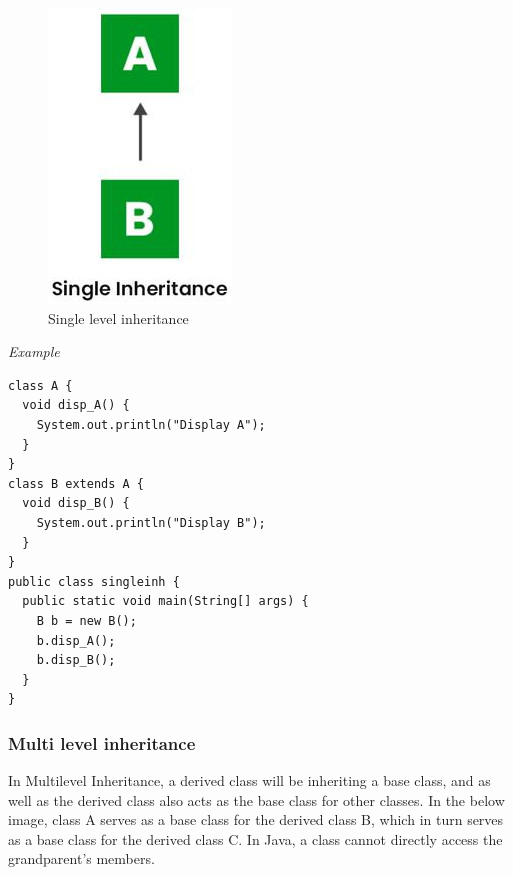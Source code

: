 \documentclass[twocolumn, a4paper]{article}
\begin{document}
\begin{figure}
  \centering
  \includegraphics[width=0.7\columnwidth]{singlevin}
  \caption{Single level inheritance}
\end{figure}

\vskip20pt
\noindent\emph{Example}
\begin{lstlisting}
class A {
  void disp_A() {
    System.out.println("Display A");
  }
}
class B extends A {
  void disp_B() {
    System.out.println("Display B");
  }
}
public class singleinh {
  public static void main(String[] args) {
    B b = new B();
    b.disp_A();
    b.disp_B();
  }
}
\end{lstlisting}

\subsubsection{Multi level inheritance}
In Multilevel Inheritance, a derived class will be inheriting a base class,
and as well as the derived class also acts as the base class for other
classes. In the below image, class A serves as a base class for the derived
class B, which in turn serves as a base class for the derived class C. In
Java, a class cannot directly access the grandparent’s members.
\end{document}
